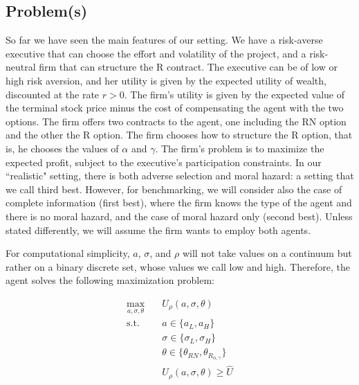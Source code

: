\subsection{Problem(s)}
So far we have seen the main features of our setting. We have a risk-averse executive that can choose the effort and volatility of the project, and a risk-neutral firm that can structure the R contract. The executive can be of low or high risk aversion, and her utility is given by the expected utility of wealth, discounted at the rate $r>0$. The firm's utility is given by the expected value of the terminal stock price minus the cost of compensating the agent with the two options. The firm offers two contracts to the agent, one including the RN option and the other the R option. The firm chooses how to structure the R option, that is, he chooses the values of $\alpha$ and $\gamma$. The firm's problem is to maximize the expected profit, subject to the executive's participation constraints. In our ``realistic" setting, there is both adverse selection and moral hazard: a setting that we call third best. However, for benchmarking, we will consider also the case of complete information (first best), where the firm knows the type of the agent and there is no moral hazard, and the case of moral hazard only (second best). Unless stated differently, we will assume the firm wants to employ both agents.

For computational simplicity, $a$, $\sigma$, and $\rho$ will not take values on a continuum but rather on a binary discrete set, whose values we call low and high. Therefore, the agent solves the following maximization problem:

\begin{equation}
    \label{eqn:agent_problem}
    \begin{aligned}
    \max_{a, \sigma, \theta} \quad & U_\rho (a, \sigma, \theta) \\
    \textrm{s.t.}       \quad & a \in \{ a_L, a_H \} \\
                        \quad & \sigma \in \{ \sigma_L, \sigma_H \} \\
                        \quad & \theta \in \{\theta_{RN}, \theta_{R_{\alpha, \gamma}} \} \\
                        \quad & U_\rho(a, \sigma, \theta) \ge \hat{U}  \\
    \end{aligned}
\end{equation}
\vspace*{4pt}

